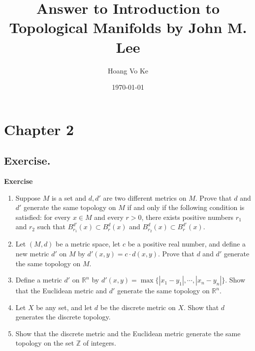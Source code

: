 \documentclass[12pt, a4paper]{article}
\title{Answer to Introduction to Topological Manifolds by John M. Lee}
\author{Hoang Vo Ke}
\date{\today}
\theoremstyle{plain}
\newcommand{\R}{\mathbb{R}}
\newcommand{\Z}{\mathbb{Z}}
\newenvironment{exercise}[2][Exercise]
    { \begin{mdframed}[backgroundcolor=gray!20] \textbf{#1 #2} \\}
    {  \end{mdframed}}
\begin{document}
\maketitle
\pagebreak
\tableofcontents
\pagebreak
\section{Chapter 2}

\subsection{Exercise.}
\begin{exercise}{2.4}
\hfill
\begin{enumerate}[label=(\alph*)]
\item Suppose $M$ is a set and $d,d'$ are two different metrics on $M$. Prove that $d$ and $d'$ generate the same topology on $M$ if and only if the following condition is satisfied: for every $x\in M$ and every $r>0$, there exists positive numbers $r_1$ and $r_2$ such that $B_{r_1}^{d'}(x)\subset B_r^d(x)$ and $B_{r_2}^d(x)\subset B_r^{d'}(x)$.
	
\item Let $(M,d)$ be a metric space, let $c$ be a positive real number, and define a new metric $d'$ on $M$ by $d'(x,y)=c\cdot d(x,y)$. Prove that $d$ and $d'$ generate the same topology on $M$.

\item Define a metric $d'$ on $\R^n$ by $d'(x,y)=\max\{|x_1-y_1|,\cdots,|x_n-y_n|\}$. Show that the Euclidean metric and $d'$ generate the same topology on $\R^n$.

\item Let $X$ be any set, and let $d$ be the discrete metric on $X$. Show that $d$ generates the discrete topology.

\item Show that the discrete metric and the Euclidean metric generate the same topology on the set $\Z$ of integers.
\end{enumerate}
\end{exercise}
\end{document}

